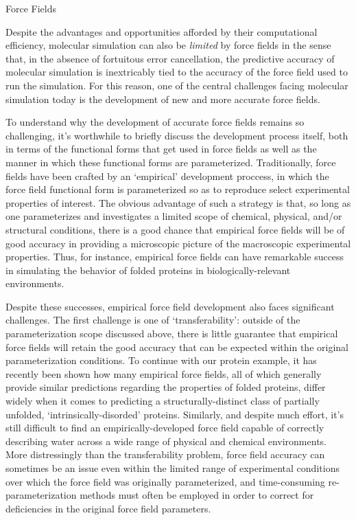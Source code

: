 \begin{section}{Force Fields}

Despite the advantages and opportunities afforded by their computational efficiency, molecular
simulation can also be \emph{limited} by force fields in the sense that, in
the absence of fortuitous error cancellation, the predictive accuracy of
molecular simulation is inextricably tied to the accuracy of the force field
used to run the simulation. For this reason, one of the central challenges
facing molecular simulation today is the development of new and more accurate
force fields.\cite{Freddolino2010,Ballone2014}

To understand why the development of accurate force fields remains so
challenging, it's worthwhile to briefly discuss the development process
itself, both in terms of the functional forms that get used in force fields as
well as the manner in which these functional forms are parameterized.
Traditionally, force fields have been crafted by an `empirical' development
proccess,\cite{Stone2007}
in which the force field functional form is parameterized so as to reproduce
select experimental properties of interest. The obvious advantage of such a
strategy is that, so long as one parameterizes and investigates a limited
scope of chemical, physical, and/or structural conditions, 
there is a good chance that empirical force fields will be of good accuracy in
providing a microscopic picture of the macroscopic experimental properties.
Thus, for instance, empirical force fields can have 
remarkable success in simulating the behavior of folded proteins in
biologically-relevant environments.
\cite{Caleman2011,Piana2014,Lopes2015} 

Despite these successes, empirical force field development also faces
significant challenges. The first challenge is one of `transferability':
outside of the parameterization scope discussed above,
there is little
guarantee that empirical force fields will retain 
the good accuracy that can be expected within the original parameterization
conditions.
\cite{Hornak2006,Freddolino2010}
To continue with our protein example, it has recently been shown how many
empirical force fields, all of which generally provide similar predictions
regarding the properties of folded proteins, differ widely when it comes to
predicting a structurally-distinct class of partially unfolded,
`intrinsically-disorded' proteins.
\cite{Rauscher2015,Piana2014}
Similarly, and despite much effort, it's still difficult to find an
empirically-developed force field capable of correctly describing
water across a wide range of physical and chemical environments.
\cite{Cisneros2016a,Jorgensen2005}
More distressingly than the transferability problem, 
force field accuracy can sometimes be an
issue 
even within the limited range of experimental conditions over which the force
field was originally parameterized,
and time-consuming re-parameterization methods must often be employed
in order to correct for deficiencies in the original force field parameters.
\cite{Hornak2006,Freddolino2010}


\end{section}
